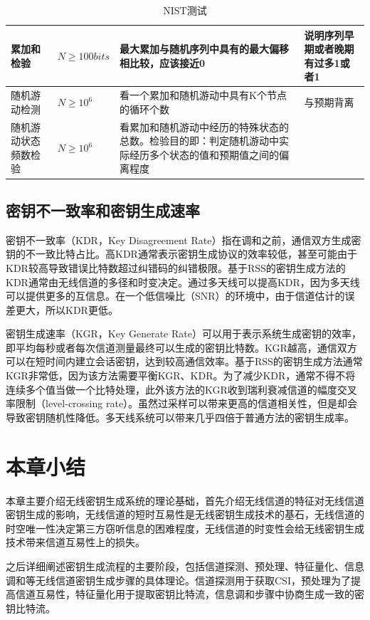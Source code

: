 \documentclass[master]{seuthesis} %
\begin{document}
\begin{Main}
\begin{table}[]
\begin{tabular}{p{70pt}p{70pt}p{200pt}p{100pt}}
    累加和检验 & $N \geq 100bits$ & 最大累加与随机序列中具有的最大偏移相比较，应该接近0 & 说明序列早期或者晚期有过多1或者1 \\ \hline
    随机游动检测 & $N \geq 10^6$ & 看一个累加和随机游动中具有K个节点的循环个数 & 与预期背离 \\ \hline
    随机游动状态频数检验 & $N \geq 10^6 $ & 看累加和随机游动中经历的特殊状态的总数。检验目的即：判定随机游动中实际经历多个状态的值和预期值之间的偏离程度 \\ \hline

    \end{tabular}
    \caption{NIST测试
    \label{NIST-schemes}}
\end{table}

\subsection{密钥不一致率和密钥生成速率}

密钥不一致率（KDR，Key Disagreement Rate）指在调和之前，通信双方生成密钥的不一致比特占比。高KDR通常表示密钥生成协议的效率较低，甚至可能由于KDR较高导致错误比特数超过纠错码的纠错极限。基于RSS的密钥生成方法的KDR通常由无线信道的多径和时变决定\cite{jana2009effectiveness}。通过多天线可以提高KDR，因为多天线可以提供更多的互信息。在一个低信噪比（SNR）的环境中，由于信道估计的误差更大，所以KDR更低。

密钥生成速率（KGR，Key Generate Rate）可以用于表示系统生成密钥的效率，即平均每秒或者每次信道测量最终可以生成的密钥比特数。KGR越高，通信双方可以在短时间内建立会话密钥，达到较高通信效率。基于RSS的密钥生成方法通常KGR非常低，因为该方法需要平衡KGR、KDR。为了减少KDR，通常不得不将连续多个值当做一个比特处理，此外该方法的KGR收到瑞利衰减信道的幅度交叉率限制（level-crossing rate）。虽然过采样可以带来更高的信道相关性，但是却会导致密钥随机性降低\cite{mathur2008radio}。多天线系统可以带来几乎四倍于普通方法的密钥生成率\cite{zeng2010exploiting}。

\section{本章小结}

本章主要介绍无线密钥生成系统的理论基础，首先介绍无线信道的特征对无线信道密钥生成的影响，无线信道的短时互易性是无线密钥生成技术的基石，无线信道的时空唯一性决定第三方窃听信息的困难程度，无线信道的时变性会给无线密钥生成技术带来信道互易性上的损失。

之后详细阐述密钥生成流程的主要阶段，包括信道探测、预处理、特征量化、信息调和等无线信道密钥生成步骤的具体理论。信道探测用于获取CSI，预处理为了提高信道互易性，特征量化用于提取密钥比特流，信息调和步骤中协商生成一致的密钥比特流。


\end{Main}
\end{document}

